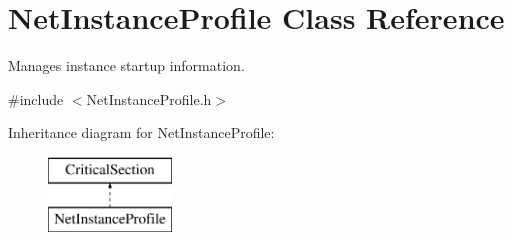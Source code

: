 \hypertarget{class_net_instance_profile}{
\section{NetInstanceProfile Class Reference}
\label{class_net_instance_profile}
}


Manages instance startup information.  




{\ttfamily \#include $<$NetInstanceProfile.h$>$}

Inheritance diagram for NetInstanceProfile:\begin{figure}[H]
\begin{center}
\leavevmode
\includegraphics[height=2.000000cm]{class_net_instance_profile}
\end{center}
\end{figure}
